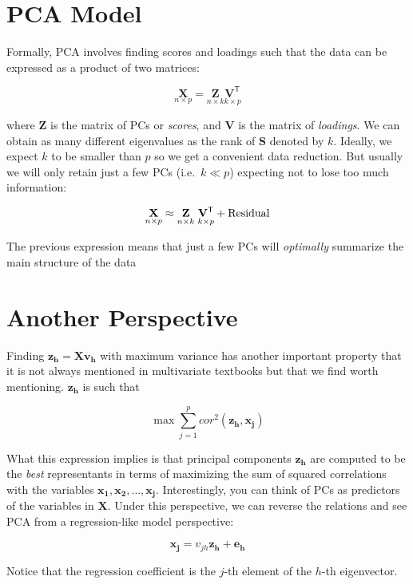 \documentclass[]{book}
\begin{document}
\hypertarget{pca-model}{%
\section{PCA Model}\label{pca-model}}

Formally, PCA involves finding scores and loadings such that the data can be
expressed as a product of two matrices:

\[
\underset{n \times p}{\mathbf{X}} = \underset{n \times k}{\mathbf{Z}} \underset{k \times p}{\mathbf{V^\mathsf{T}}}
\]

where \(\mathbf{Z}\) is the matrix of PCs or \emph{scores}, and \(\mathbf{V}\) is the
matrix of \emph{loadings}. We can obtain as many different eigenvalues as the rank of
\(\mathbf{S}\) denoted by \(k\). Ideally, we expect \(k\) to be smaller than \(p\)
so we get a convenient data reduction. But usually we will only retain just a
few PCs (i.e.~\(k \ll p\)) expecting not to lose too much information:

\[
\underset{n \times p}{\mathbf{X}} \approx \underset{n \times k}{\mathbf{Z}} \hspace{1mm} \underset{k \times p}{\mathbf{V^\mathsf{T}}} + \text{Residual}
\]

The previous expression means that just a few PCs will \emph{optimally} summarize the main structure of the data

\hypertarget{another-perspective}{%
\section{Another Perspective}\label{another-perspective}}

Finding \(\mathbf{z_h} = \mathbf{X v_h}\) with maximum variance has another
important property that it is not always mentioned in multivariate textbooks
but that we find worth mentioning. \(\mathbf{z_h}\) is such that

\[
\max \sum_{j = 1}^{p} cor^2(\mathbf{z_h, x_j})
\]

What this expression implies is that principal components \(\mathbf{z_h}\) are
computed to be the \emph{best} representants in terms of maximizing the sum of
squared correlations with the variables
\(\mathbf{x_1}, \mathbf{x_2}, \dots, \mathbf{x_j}\).
Interestingly, you can think of PCs as predictors
of the variables in \(\mathbf{X}\). Under this perspective, we can reverse the
relations and see PCA from a regression-like model perspective:

\[
\mathbf{x_j} = v_{jh} \mathbf{z_h} + \mathbf{e_h}
\]

Notice that the regression coefficient is the \(j\)-th element of the \(h\)-th
eigenvector.


\end{document}
